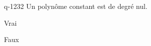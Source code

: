 \begin{truefalse}{q-1232}
Un polynôme constant est de degré nul.
\item Vrai
\item* Faux
\end{truefalse}

